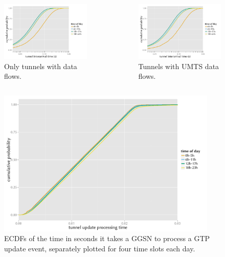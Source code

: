 \documentclass{beamer}
\begin{document}
\begin{frame}
\begin{columns}
		\begin{figure}
			\includegraphics[width=0.7\columnwidth]{../../chapters/041-mobilenetsmeasuring/images/R-IAT-fromflows-ecdfs-2h.pdf}
			\vspace{-4mm}
			\caption{Only tunnels with data flows.}
		\end{figure}
		\vspace{-10mm}
		\begin{figure}
			\includegraphics[width=0.7\columnwidth]{../../chapters/041-mobilenetsmeasuring/images/R-IAT-fromflows-umts-ecdfs-2h.pdf}
			\vspace{-4mm}
			\caption{Tunnels with UMTS data flows.}
		\end{figure}
	\end{columns}
\end{frame}

\begin{frame}
	\begin{figure}
		\centering
		\includegraphics[height=7cm]{../../chapters/041-mobilenetsmeasuring/images/R-update-time-cdfs.pdf}
		\caption{ECDFs of the time in seconds it takes a GGSN to process a GTP update event, separately plotted for four time slots each day.}
	\end{figure}
\end{frame}
\end{document}
